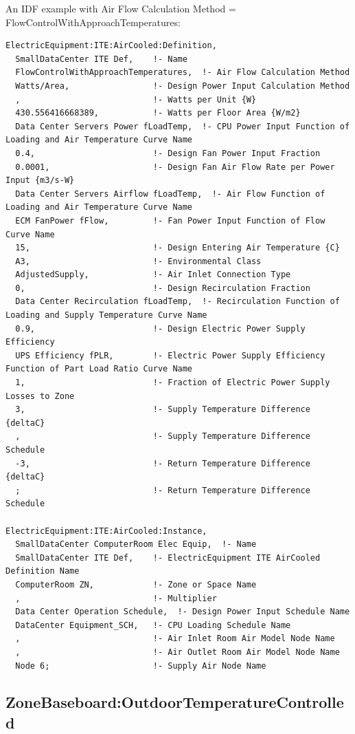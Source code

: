 An IDF example with Air Flow Calculation Method = FlowControlWithApproachTemperatures:

\begin{lstlisting}
ElectricEquipment:ITE:AirCooled:Definition,
  SmallDataCenter ITE Def,    !- Name
  FlowControlWithApproachTemperatures,  !- Air Flow Calculation Method
  Watts/Area,                 !- Design Power Input Calculation Method
  ,                           !- Watts per Unit {W}
  430.556416668389,           !- Watts per Floor Area {W/m2}
  Data Center Servers Power fLoadTemp,  !- CPU Power Input Function of Loading and Air Temperature Curve Name
  0.4,                        !- Design Fan Power Input Fraction
  0.0001,                     !- Design Fan Air Flow Rate per Power Input {m3/s-W}
  Data Center Servers Airflow fLoadTemp,  !- Air Flow Function of Loading and Air Temperature Curve Name
  ECM FanPower fFlow,         !- Fan Power Input Function of Flow Curve Name
  15,                         !- Design Entering Air Temperature {C}
  A3,                         !- Environmental Class
  AdjustedSupply,             !- Air Inlet Connection Type
  0,                          !- Design Recirculation Fraction
  Data Center Recirculation fLoadTemp,  !- Recirculation Function of Loading and Supply Temperature Curve Name
  0.9,                        !- Design Electric Power Supply Efficiency
  UPS Efficiency fPLR,        !- Electric Power Supply Efficiency Function of Part Load Ratio Curve Name
  1,                          !- Fraction of Electric Power Supply Losses to Zone
  3,                          !- Supply Temperature Difference {deltaC}
  ,                           !- Supply Temperature Difference Schedule
  -3,                         !- Return Temperature Difference {deltaC}
  ;                           !- Return Temperature Difference Schedule

ElectricEquipment:ITE:AirCooled:Instance,
  SmallDataCenter ComputerRoom Elec Equip,  !- Name
  SmallDataCenter ITE Def,    !- ElectricEquipment ITE AirCooled Definition Name
  ComputerRoom ZN,            !- Zone or Space Name
  ,                           !- Multiplier
  Data Center Operation Schedule,  !- Design Power Input Schedule Name
  DataCenter Equipment_SCH,   !- CPU Loading Schedule Name
  ,                           !- Air Inlet Room Air Model Node Name
  ,                           !- Air Outlet Room Air Model Node Name
  Node 6;                     !- Supply Air Node Name
\end{lstlisting}

\subsection{ZoneBaseboard:OutdoorTemperatureControlled}\label{zonebaseboardoutdoortemperaturecontrolled}

